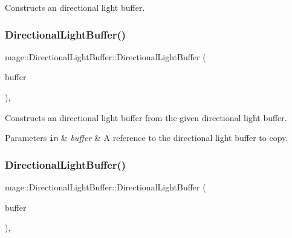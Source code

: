 Constructs an directional light buffer. \hypertarget{structmage_1_1_directional_light_buffer_a9344489e735a789027ff62f962e875f7}{}\label{structmage_1_1_directional_light_buffer_a9344489e735a789027ff62f962e875f7} 
\subsubsection{\texorpdfstring{Directional\+Light\+Buffer()}{DirectionalLightBuffer()}\hspace{0.1cm}{\footnotesize\ttfamily [2/3]}}
{\footnotesize\ttfamily mage\+::\+Directional\+Light\+Buffer\+::\+Directional\+Light\+Buffer (\begin{DoxyParamCaption}\item[{const \hyperlink{structmage_1_1_directional_light_buffer}{Directional\+Light\+Buffer} \&}]{buffer }\end{DoxyParamCaption})\hspace{0.3cm}{\ttfamily [default]}, {\ttfamily [noexcept]}}

Constructs an directional light buffer from the given directional light buffer.


\begin{DoxyParams}[1]{Parameters}
\mbox{\tt in}  & {\em buffer} & A reference to the directional light buffer to copy. \\
\hline
\end{DoxyParams}
\hypertarget{structmage_1_1_directional_light_buffer_af8ba47c18ce44fa9638bb7f9654188b7}{}\label{structmage_1_1_directional_light_buffer_af8ba47c18ce44fa9638bb7f9654188b7} 
\subsubsection{\texorpdfstring{Directional\+Light\+Buffer()}{DirectionalLightBuffer()}\hspace{0.1cm}{\footnotesize\ttfamily [3/3]}}
{\footnotesize\ttfamily mage\+::\+Directional\+Light\+Buffer\+::\+Directional\+Light\+Buffer (\begin{DoxyParamCaption}\item[{\hyperlink{structmage_1_1_directional_light_buffer}{Directional\+Light\+Buffer} \&\&}]{buffer }\end{DoxyParamCaption})\hspace{0.3cm}{\ttfamily [default]}, {\ttfamily [noexcept]}}


